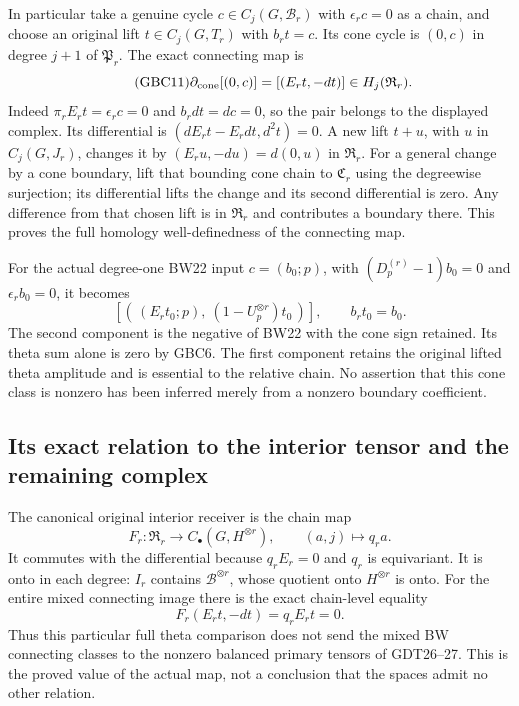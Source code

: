 In particular take a genuine cycle $c\in C_j(G,\mathcal B_r)$
with $\epsilon_rc=0$ as a chain, and choose an original lift
$t\in C_j(G,T_r)$ with $b_rt=c$. Its cone cycle is $(0,c)$
in degree $j+1$ of $\mathfrak P_r$. The exact connecting map is
\begin{equation}\tag{GBC11}
 \partial_{\rm cone}[(0,c)]=[(E_rt,-dt)]\in H_j(\mathfrak R_r).
\end{equation}
Indeed $\pi_rE_rt=\epsilon_rc=0$ and $b_rdt=dc=0$, so
the pair belongs to the displayed complex. Its differential is
$(dE_rt-E_rdt,d^2t)=0$. A new lift $t+u$, with $u$ in
$C_j(G,J_r)$, changes it by $(E_ru,-du)=d(0,u)$ in
$\mathfrak R_r$. For a general change by a cone boundary, lift
that bounding cone chain to $\mathfrak C_r$ using the degreewise
surjection; its differential lifts the change and its second
differential is zero. Any difference from that chosen lift is
in $\mathfrak R_r$ and contributes a boundary there. This proves
the full homology well-definedness of the connecting map.

For the actual degree-one BW22 input $c=(b_0;p)$, with
$(D_p^{(r)}-1)b_0=0$ and $\epsilon_rb_0=0$, it becomes
\begin{equation}\tag{GBC12}
 \left[(\,(E_rt_0;p),\ (1-U_p^{\otimes r})t_0\,)\right],
               \qquad b_rt_0=b_0.
\end{equation}
The second component is the negative of BW22 with the cone sign
retained. Its theta sum alone is zero by GBC6. The first component
retains the original lifted theta amplitude and is essential to the
relative chain. No assertion that this cone class is nonzero has
been inferred merely from a nonzero boundary coefficient.

\subsection{Its exact relation to the interior tensor and the remaining complex}

The canonical original interior receiver is the chain map
\begin{equation}\tag{GBC13}
 F_r:\mathfrak R_r\longrightarrow C_\bullet(G,H^{\otimes r}),
                    \qquad (a,j)\longmapsto q_ra.
\end{equation}
It commutes with the differential because $q_rE_r=0$ and $q_r$
is equivariant. It is onto in each degree: $I_r$ contains
$\mathscr B^{\otimes r}$, whose quotient onto $H^{\otimes r}$
is onto. For the entire mixed connecting image there is the exact
chain-level equality
\begin{equation}\tag{GBC14}
 F_r(E_rt,-dt)=q_rE_rt=0.
\end{equation}
Thus this particular full theta comparison does not send the
mixed BW connecting classes to the nonzero balanced primary
tensors of GDT26--27. This is the proved value of the actual map,
not a conclusion that the spaces admit no other relation.

